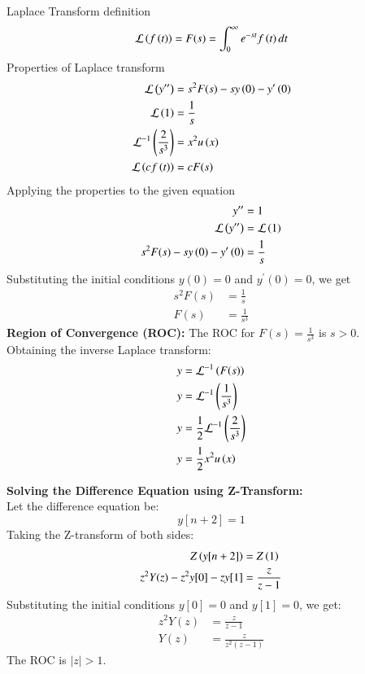 \documentclass[journal]{IEEEtran}
\begin{document}
Laplace Transform definition\\
\begin{align}
    \mathcal{L}\left(f\left(t\right)\right) = F(s) = \int_{0}^{\infty}e^{-st}f\left(t\right)dt
\end{align}
Properties of Laplace transform
\begin{align}
    \mathcal{L}\left(y^{\prime\prime}\right) &= s^2F(s) - sy\left(0\right) - y^\prime\left(0\right)\\
    \mathcal{L}\left(1\right) &= \frac{1}{s}\\
    \mathcal{L}^{-1}\left(\frac{2}{s^3}\right) &= x^2u\left(x\right)\\
    \mathcal{L}\left(cf\left(t\right)\right) &= cF(s)
\end{align}
Applying the properties to the given equation
\begin{align}
    y^{\prime\prime} &= 1\\
    \mathcal{L}\left(y^{\prime\prime}\right) &= \mathcal{L}\left(1\right)\\
    s^2F(s) - sy\left(0\right) - y^\prime\left(0\right) &= \frac{1}{s}
\end{align}
Substituting the initial conditions \(y(0) = 0\) and \(y^\prime(0) = 0\), we get
\begin{align}
    s^2F(s) &= \frac{1}{s}\\
    F(s) &= \frac{1}{s^3}
\end{align}
\textbf{Region of Convergence (ROC):} The ROC for \(F(s) = \frac{1}{s^3}\) is \(s > 0\).\\

Obtaining the inverse Laplace transform:
\begin{align}
    y &= \mathcal{L}^{-1}\left(F(s)\right)\\
    y &= \mathcal{L}^{-1}\left(\frac{1}{s^3}\right)\\
    y &= \frac{1}{2}\mathcal{L}^{-1}\left(\frac{2}{s^3}\right)\\
    y &= \frac{1}{2}x^2u\left(x\right)
\end{align}

\textbf{Solving the Difference Equation using Z-Transform:}\\
Let the difference equation be:
\[
y[n+2] = 1
\]
Taking the Z-transform of both sides:
\begin{align}
    Z\left(y[n+2]\right) &= Z\left(1\right)\\
    z^2Y(z) - z^2y[0] - zy[1] &= \frac{z}{z-1}
\end{align}
Substituting the initial conditions \(y[0] = 0\) and \(y[1] = 0\), we get:
\begin{align}
    z^2Y(z) &= \frac{z}{z-1}\\
    Y(z) &= \frac{z}{z^2(z-1)}
\end{align}
The ROC is \(|z| > 1\).\\
\end{document}
